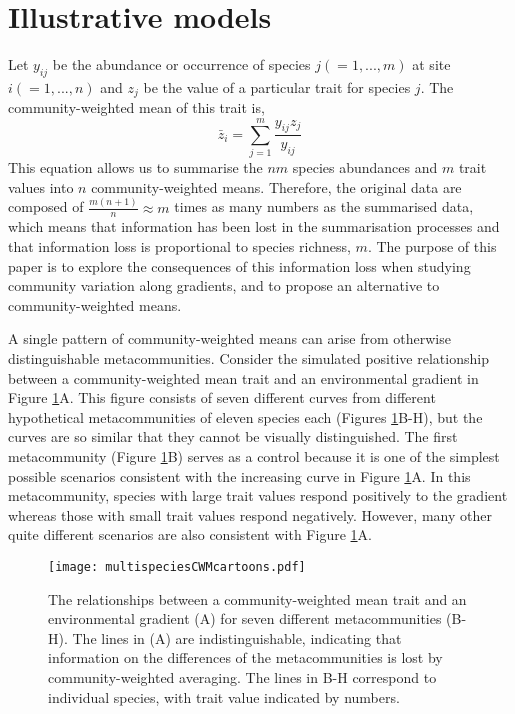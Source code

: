 \documentclass[12pt]{ecology}
\begin{document}
\section{Illustrative models}

Let $y_{ij}$ be the abundance or occurrence of species $j (= 1, ..., m)$ at site $i (= 1, ..., n)$ and $z_j$ be the value of a particular trait for species $j$.  The community-weighted mean of this trait is,
\begin{equation} 
\bar{z}_i = \sum_{j=1}^m \frac{y_{ij} z_j}{y_{ij}}
\label{eq:cwmdef}
\end{equation}
This equation allows us to summarise the $nm$ species abundances and $m$ trait values into $n$ community-weighted means.  Therefore, the original data are composed of $\frac{m(n + 1)}{n} \approx m$ times as many numbers as the summarised data, which means that information has been lost in the summarisation processes and that information loss is proportional to species richness, $m$.  The purpose of this paper is to explore the consequences of this information loss when studying community variation along gradients, and to propose an alternative to community-weighted means.

A single pattern of community-weighted means can arise from otherwise distinguishable metacommunities.  Consider the simulated positive relationship between a community-weighted mean trait and an environmental gradient in Figure \ref{fig:graphicalmodels}A.  This figure consists of seven different curves from different hypothetical metacommunities of eleven species each (Figures \ref{fig:graphicalmodels}B-H), but the curves are so similar that they cannot be visually distinguished.  The first metacommunity (Figure \ref{fig:graphicalmodels}B) serves as a control because it is one of the simplest possible scenarios consistent with the increasing curve in Figure \ref{fig:graphicalmodels}A.  In this metacommunity, species with large trait values respond positively to the gradient whereas those with small trait values respond negatively.  However, many other quite different scenarios are also consistent with Figure \ref{fig:graphicalmodels}A.

\begin{figure}

\texttt{[image: multispeciesCWMcartoons.pdf]}

\caption{The relationships between a community-weighted mean trait and an environmental gradient (A) for seven different metacommunities (B-H).  The lines in (A) are indistinguishable, indicating that information on the differences of the metacommunities is lost by community-weighted averaging.  The lines in B-H correspond to individual species, with trait value indicated by numbers.}
\label{fig:graphicalmodels}

\end{figure}
\end{document}
